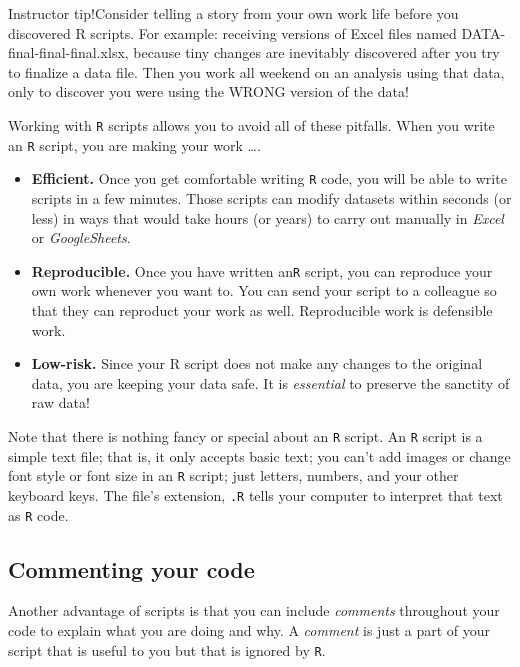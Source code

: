 \documentclass[
]{book}
\begin{document}
Instructor tip!Consider telling a story from your own work life before you discovered R scripts. For example: receiving versions of Excel files named DATA-final-final-final.xlsx, because tiny changes are inevitably discovered after you try to finalize a data file. Then you work all weekend on an analysis using that data, only to discover you were using the WRONG version of the data!

Working with \texttt{R} scripts allows you to avoid all of these pitfalls. When you write an \texttt{R} script, you are making your work \ldots.

\begin{itemize}
\item
  \textbf{Efficient.} Once you get comfortable writing \texttt{R} code, you will be able to write scripts in a few minutes. Those scripts can modify datasets within seconds (or less) in ways that would take hours (or years) to carry out manually in \emph{Excel} or \emph{GoogleSheets}.
\item
  \textbf{Reproducible.} Once you have written an\texttt{R} script, you can reproduce your own work whenever you want to. You can send your script to a colleague so that they can reproduct your work as well. Reproducible work is defensible work.
\item
  \textbf{Low-risk.} Since your R script does not make any changes to the original data, you are keeping your data safe. It is \emph{essential} to preserve the sanctity of raw data!
\end{itemize}

Note that there is nothing fancy or special about an \texttt{R} script. An \texttt{R} script is a simple text file; that is, it only accepts basic text; you can't add images or change font style or font size in an \texttt{R} script; just letters, numbers, and your other keyboard keys. The file's extension, \texttt{.R} tells your computer to interpret that text as \texttt{R} code.

\hypertarget{commenting-your-code}{%
\subsection*{Commenting your code}\label{commenting-your-code}}

Another advantage of scripts is that you can include \emph{comments} throughout your code to explain what you are doing and why. A \emph{comment} is just a part of your script that is useful to you but that is ignored by \texttt{R}.
\end{document}
